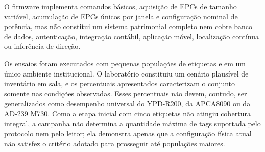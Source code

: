 O firmware implementa comandos básicos, aquisição de EPCs de tamanho variável, acumulação de EPCs únicos por janela e configuração nominal de potência, mas não constitui um sistema patrimonial completo nem cobre banco de dados, autenticação, integração contábil, aplicação móvel, localização contínua ou inferência de direção.

Os ensaios foram executados com pequenas populações de etiquetas e em um único ambiente institucional. O laboratório constituiu um cenário plausível de inventário em sala, e os percentuais apresentados caracterizam o conjunto somente nas condições observadas. Esses percentuais não devem, contudo, ser generalizados como desempenho universal do YPD-R200, da APCA8090 ou da AD-239 M730. Como a etapa inicial com cinco etiquetas não atingiu cobertura integral, a campanha não determina a quantidade máxima de tags suportada pelo protocolo nem pelo leitor; ela demonstra apenas que a configuração física atual não satisfez o critério adotado para prosseguir até populações maiores.
